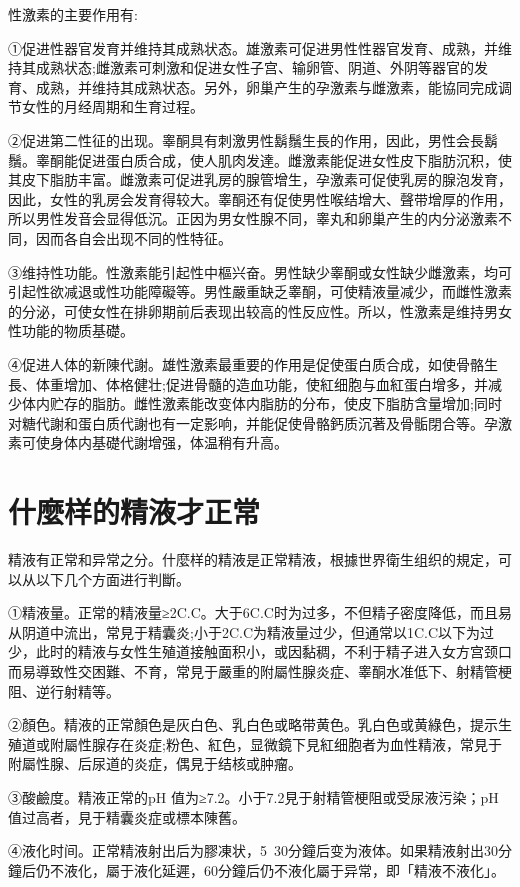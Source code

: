 \documentclass[12pt,UTF8]{ctexbook}
\begin{document}
性激素的主要作用有:

①促进性器官发育并维持其成熟状态。雄激素可促进男性性器官发育、成熟，并维持其成熟状态;雌激素可刺激和促进女性子宫、输卵管、阴道、外阴等器官的发育、成熟，并维持其成熟状态。另外，卵巢产生的孕激素与雌激素，能協同完成调节女性的月经周期和生育过程。

②促进第二性征的出现。睾酮具有刺激男性鬍鬚生長的作用，因此，男性会長鬍鬚。睾酮能促进蛋白质合成，使人肌肉发達。雌激素能促进女性皮下脂肪沉积，使其皮下脂肪丰富。雌激素可促进乳房的腺管增生，孕激素可促使乳房的腺泡发育，因此，女性的乳房会发育得较大。睾酮还有促使男性喉结增大、聲带增厚的作用，所以男性发音会显得低沉。正因为男女性腺不同，睾丸和卵巢产生的内分泌激素不同，因而各自会出现不同的性特征。

③维持性功能。性激素能引起性中樞兴奋。男性缺少睾酮或女性缺少雌激素，均可引起性欲减退或性功能障礙等。男性嚴重缺乏睾酮，可使精液量减少，而雌性激素的分泌，可使女性在排卵期前后表现出较高的性反应性。所以，性激素是维持男女性功能的物质基礎。

④促进人体的新陳代謝。雄性激素最重要的作用是促使蛋白质合成，如使骨骼生長、体重增加、体格健壮;促进骨髓的造血功能，使紅细胞与血紅蛋白增多，并减少体内贮存的脂肪。雌性激素能改变体内脂肪的分布，使皮下脂肪含量增加;同时对糖代謝和蛋白质代謝也有一定影响，并能促使骨骼鈣质沉著及骨骺閉合等。孕激素可使身体内基礎代謝增强，体温稍有升高。

\section{什麼样的精液才正常}

精液有正常和异常之分。什麼样的精液是正常精液，根據世界衛生组织的規定，可以从以下几个方面进行判斷。

①精液量。正常的精液量≥2C.C。大于6C.C时为过多，不但精子密度降低，而且易从阴道中流出，常見于精囊炎;小于2C.C为精液量过少，但通常以1C.C以下为过少，此时的精液与女性生殖道接触面积小，或因黏稠，不利于精子进入女方宫颈口而易導致性交困難、不育，常見于嚴重的附屬性腺炎症、睾酮水准低下、射精管梗阻、逆行射精等。

②顏色。精液的正常顏色是灰白色、乳白色或略带黄色。乳白色或黄綠色，提示生殖道或附屬性腺存在炎症;粉色、紅色，显微鏡下見紅细胞者为血性精液，常見于附屬性腺、后尿道的炎症，偶見于结核或肿瘤。

③酸鹼度。精液正常的pH 值为≥7.2。小于7.2見于射精管梗阻或受尿液污染；pH值过高者，見于精囊炎症或標本陳舊。

④液化时间。正常精液射出后为膠凍状，5~30分鐘后变为液体。如果精液射出30分鐘后仍不液化，屬于液化延遲，60分鐘后仍不液化屬于异常，即「精液不液化」。
\end{document}
